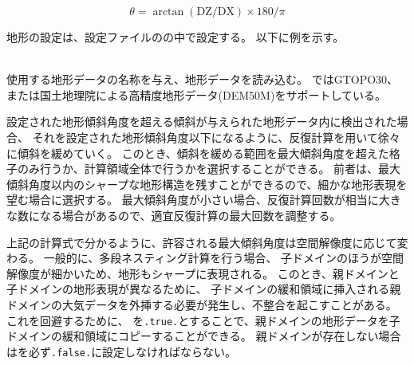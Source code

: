 \[ \theta = \arctan( \mathrm{DZ}/\mathrm{DX} ) \times 180/\pi \]

地形の設定は、設定ファイルのの中で設定する。
以下に例を示す。\\

\\



使用する地形データの名称を与え、地形データを読み込む。
\scalerm ではGTOPO30、または国土地理院による高精度地形データ(DEM50M)をサポートしている。

設定された地形傾斜角度を超える傾斜が与えられた地形データ内に検出された場合、
それを設定された地形傾斜角度以下になるように、反復計算を用いて徐々に傾斜を緩めていく。
このとき、傾斜を緩める範囲を最大傾斜角度を超えた格子のみ行うか、計算領域全体で行うかを選択することができる。
前者は、最大傾斜角度以内のシャープな地形構造を残すことができるので、細かな地形表現を望む場合に選択する。
最大傾斜角度が小さい場合、反復計算回数が相当に大きな数になる場合があるので、適宜反復計算の最大回数を調整する。

上記の計算式で分かるように、許容される最大傾斜角度は空間解像度に応じて変わる。
一般的に、多段ネスティング計算を行う場合、
子ドメインのほうが空間解像度が細かいため、地形もシャープに表現される。
このとき、親ドメインと子ドメインの地形表現が異なるために、
子ドメインの緩和領域に挿入される親ドメインの大気データを外挿する必要が発生し、不整合を起こすことがある。
これを回避するために、
を\verb|.true.|とすることで、親ドメインの地形データを子ドメインの緩和領域にコピーすることができる。
親ドメインが存在しない場合はを必ず\verb|.false.|に設定しなければならない。
